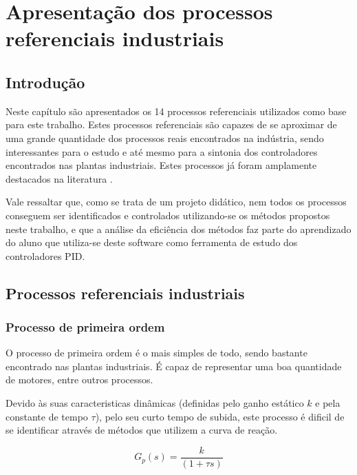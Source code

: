 \chapter{Apresentação dos processos referenciais industriais
    \label{cap:processos-referenciais}}

\section{Introdução}

Neste capítulo são apresentados os 14 processos referenciais utilizados
como base para este trabalho. Estes processos referenciais são capazes de se
aproximar de uma grande quantidade dos processos reais encontrados na indústria,
sendo interessantes para o estudo e até mesmo para a sintonia dos controladores
encontrados nas plantas industriais. Estes processos já foram amplamente destacados
na literatura \cite{Isermann} \cite{AstromHagglund}.

Vale ressaltar que, como se trata de um projeto didático, nem todos os processos
conseguem ser identificados e controlados utilizando-se os métodos propostos
neste trabalho, e que a análise da eficiência dos métodos faz parte do aprendizado
do aluno que utiliza-se deste software como ferramenta de estudo dos controladores
\acs{PID}.

\section{Processos referenciais industriais}

\subsection{Processo de primeira ordem}
    
    O processo de primeira ordem é o mais simples de todo, sendo bastante encontrado
    nas plantas industriais. É capaz de representar uma boa quantidade de motores,
    entre outros processos.
    
    Devido às suas caracteristicas dinâmicas (definidas pelo ganho estático $k$ e
    pela constante de tempo $\tau$), pelo seu curto tempo de subida, este processo
    é dificil de se identificar através de métodos que utilizem a curva de reação.
    
    \begin{equation}
        G_p(s) = \frac{k}{(1+\tau s)}
    \end{equation}
    
